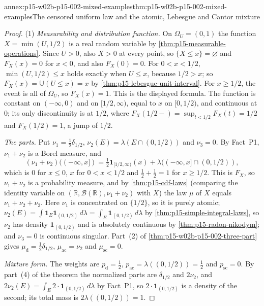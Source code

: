 \begin{annexitem}{annex:p15-w02b-p15-002-mixed-examples}{thm:p15-w02b-p15-002-mixed-examples}{The censored uniform law and the atomic, Lebesgue and Cantor mixture}
\begin{proof}
(1) \emph{Measurability and distribution function.} On
\(\Omega_U=(0,1)\) the function \(X=\min(U,1/2)\) is a real random
variable by \cref{thm:p15-measurable-operations}. Since \(U>0\), also
\(X>0\) at every point, so \(\{X\leq x\}=\varnothing\) and
\(F_X(x)=0\) for \(x<0\), and also \(F_X(0)=0\). For \(0<x<1/2\),
\(\min(U,1/2)\leq x\) holds exactly when \(U\leq x\), because
\(1/2>x\); so \(F_X(x)=\mathbb U(U\leq x)=x\) by
\cref{thm:p15-lebesgue-unit-interval}. For \(x\geq1/2\), the event is
all of \(\Omega_U\), so \(F_X(x)=1\). This is the displayed formula. The
function is constant on \((-\infty,0)\) and on \([1/2,\infty)\), equal
to \(x\) on \([0,1/2)\), and continuous at \(0\); its only discontinuity
is at \(1/2\), where \(F_X(1/2-)=\sup_{t<1/2}F_X(t)=1/2\) and
\(F_X(1/2)=1\), a jump of \(1/2\).

\emph{The parts.} Put \(\nu_1=\tfrac12\delta_{1/2}\),
\(\nu_2(E)=\lambda(E\cap(0,1/2))\) and \(\nu_3=0\). By Fact~P1,
\(\nu_1+\nu_2\) is a Borel measure, and
\[
 (\nu_1+\nu_2)((-\infty,x])=
 \tfrac12\mathbf1_{[1/2,\infty)}(x)+\lambda((-\infty,x]\cap(0,1/2)),
\]
which is \(0\) for \(x\leq0\), \(x\) for \(0<x<1/2\) and
\(\tfrac12+\tfrac12=1\) for \(x\geq1/2\). This is \(F_X\), so
\(\nu_1+\nu_2\) is a probability measure, and by
\cref{thm:p15-cdf-laws} (comparing the identity variable on
\((\mathbb R,\mathcal B(\mathbb R),\nu_1+\nu_2)\) with \(X\)) the law
\(\mu\) of \(X\) equals \(\nu_1+\nu_2+\nu_3\). Here \(\nu_1\) is
concentrated on \(\{1/2\}\), so it is purely atomic; \(\nu_2(E)
=\int\mathbf1_E\mathbf1_{(0,1/2)}\,d\lambda=\int_E\mathbf1_{(0,1/2)}\,d\lambda\)
by \cref{thm:p15-simple-integral-laws}, so \(\nu_2\) has density
\(\mathbf1_{(0,1/2)}\) and is absolutely continuous by
\cref{thm:p15-radon-nikodym}; and \(\nu_3=0\) is continuous singular.
Part~(2) of \cref{thm:p15-w02b-p15-002-three-part} gives
\(\mu_{\mathrm d}=\tfrac12\delta_{1/2}\),
\(\mu_{\mathrm{ac}}=\nu_2\) and \(\mu_{\mathrm{sc}}=0\).

\emph{Mixture form.} The weights are
\(p_{\mathrm d}=\tfrac12\), \(p_{\mathrm{ac}}=\lambda((0,1/2))=\tfrac12\)
and \(p_{\mathrm{sc}}=0\). By part~(4) of the theorem the normalized
parts are \(\delta_{1/2}\) and \(2\nu_2\), and
\(2\nu_2(E)=\int_E2\cdot\mathbf1_{(0,1/2)}\,d\lambda\) by Fact~P1, so
\(2\cdot\mathbf1_{(0,1/2)}\) is a density of the second; its total mass
is \(2\lambda((0,1/2))=1\).


\end{proof}
\end{annexitem}
